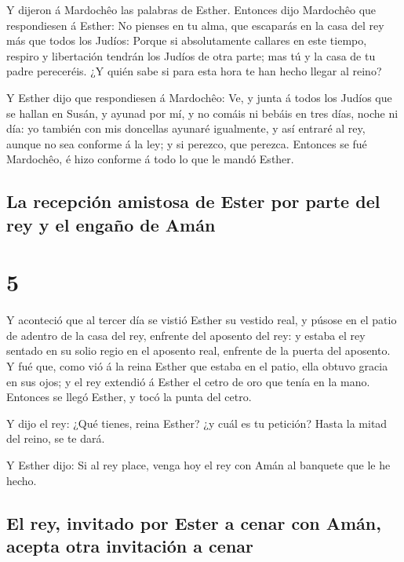 Y dijeron á Mardochêo las palabras de Esther.
 Entonces dijo Mardochêo que respondiesen á Esther: No
pienses en tu alma, que escaparás en la casa del rey más que todos los
Judíos:  Porque si absolutamente callares en este tiempo,
respiro y libertación tendrán los Judíos de otra parte; mas tú y la casa
de tu padre pereceréis. ¿Y quién sabe si para esta hora te han hecho
llegar al reino?

 Y Esther dijo que respondiesen á Mardochêo:
 Ve, y junta á todos los Judíos que se hallan en Susán, y
ayunad por mí, y no comáis ni bebáis en tres días, noche ni día: yo
también con mis doncellas ayunaré igualmente, y así entraré al rey,
aunque no sea conforme á la ley; y si perezco, que perezca.
 Entonces se fué Mardochêo, é hizo conforme á todo lo que
le mandó Esther.

\hypertarget{la-recepciuxf3n-amistosa-de-ester-por-parte-del-rey-y-el-engauxf1o-de-amuxe1n}{%
\subsection{La recepción amistosa de Ester por parte del rey y el engaño
de
Amán}\label{la-recepciuxf3n-amistosa-de-ester-por-parte-del-rey-y-el-engauxf1o-de-amuxe1n}}

\hypertarget{section-17-5}{%
\section{5}\label{section-17-5}}

 Y aconteció que al tercer día se vistió Esther su vestido
real, y púsose en el patio de adentro de la casa del rey, enfrente del
aposento del rey: y estaba el rey sentado en su solio regio en el
aposento real, enfrente de la puerta del aposento.  Y fué
que, como vió á la reina Esther que estaba en el patio, ella obtuvo
gracia en sus ojos; y el rey extendió á Esther el cetro de oro que tenía
en la mano. Entonces se llegó Esther, y tocó la punta del cetro.

 Y dijo el rey: ¿Qué tienes, reina Esther? ¿y cuál es tu
petición? Hasta la mitad del reino, se te dará.

 Y Esther dijo: Si al rey place, venga hoy el rey con Amán
al banquete que le he hecho.

\hypertarget{el-rey-invitado-por-ester-a-cenar-con-amuxe1n-acepta-otra-invitaciuxf3n-a-cenar}{%
\subsection{El rey, invitado por Ester a cenar con Amán, acepta otra
invitación a
cenar}\label{el-rey-invitado-por-ester-a-cenar-con-amuxe1n-acepta-otra-invitaciuxf3n-a-cenar}}

